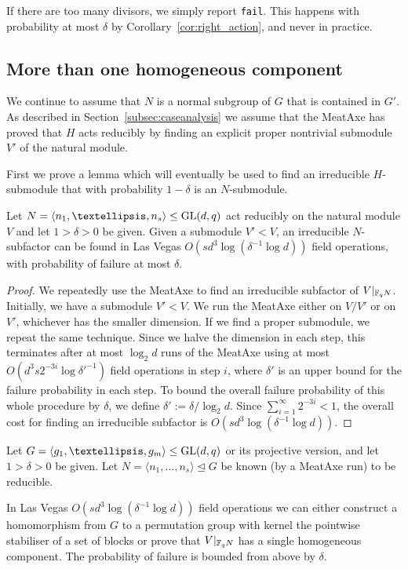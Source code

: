  If there
are too many divisors, we simply report {\tt fail}. This happens
with probability at most $\delta$ by Corollary~\ref{cor:right_action}, 
and never in practice. 

\subsection{More than one homogeneous component} \label{subsec:imprim}

We continue to assume that $N$ is a normal subgroup of $G$ that is
contained in $G'$. As described in
Section~\ref{subsec:caseanalysis} we assume that the MeatAxe 
has proved that $H$ acts reducibly by finding an explicit
proper nontrivial submodule $V'$ of the natural module.

First we prove a lemma which will eventually be used to find an 
irreducible $H$-submodule that with probability $1 - \delta$ 
is an $N$-submodule. 
\begin{Lemm}  \label{lem:find_irred}
Let $N = \langle n_1, \ldots, n_s \rangle \leq \GL(d, q)$ act reducibly
on the natural module $V$ and let $1 > \delta > 0$ be given. 
Given a submodule $V' < V$, an irreducible
$N$-subfactor can be found in Las Vegas $O(s d^3 \log (\delta^{-1} \log
d))$ field operations, with probability of failure at most
$\delta$.
\end{Lemm}

\begin{proof}
We repeatedly use the MeatAxe to find an irreducible subfactor
of $V|_{\mathbb{F}_q N}$. Initially, we have a submodule $V' < V$.
We run the MeatAxe either on  $V/V'$ or on $V'$, whichever has the
smaller dimension. If we find a proper submodule, we repeat the same
technique. Since we halve the dimension in each step, this terminates after
 at most
$\log_2 d$ runs of the MeatAxe using at most 
$O(d^3s2^{-3i}\log\delta'^{-1})$ field operations in step $i$, where
$\delta'$ is an upper bound for the failure probability in each step.
To bound the overall failure probability of this whole
procedure by  $\delta$, we define $\delta' :=
\delta/\log_2 d$. Since $\sum_{i=1}^\infty 2^{-3i} < 1$, the overall
cost for finding an irreducible subfactor is 
$O(sd^3 \log(\delta^{-1} \log d))$.
\end{proof}

\begin{Theo}  \label{thm:imp_reduct}
Let $G = \langle g_1, \ldots, g_m \rangle \leq \GL(d, q)$ or its
projective version, and let $1 > \delta > 0$ be given. Let $N =
\langle n_1, \ldots, n_s \rangle \unlhd G$ be known (by a MeatAxe
run) to be reducible. 

In Las Vegas $O(sd^3 \log (\delta^{-1} \log
d))$ field operations  we can either construct a homomorphism from $G$ to a
permutation group with kernel the pointwise stabiliser of a set of blocks 
 or prove that $V|_{\mathbb{F}_q N}$ has a single homogeneous component.
The probability of failure is bounded from above by $\delta$.
\end{Theo}

